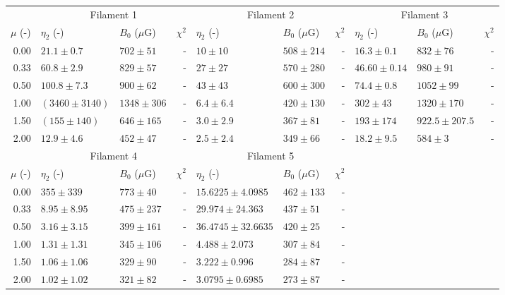 \begin{tabular}{@{}rllr llr llr@{}}

\toprule
{} & \multicolumn{3}{c}{Filament 1}
   & \multicolumn{3}{c}{Filament 2}
   & \multicolumn{3}{c}{Filament 3} \\
\cmidrule(lr){2-4} \cmidrule(lr){5-7} \cmidrule(lr){8-10}
$\mu$ (-) & $\eta_2$ (-) & $B_0$ ($\mu$G) & $\chi^2$
          & $\eta_2$ (-) & $B_0$ ($\mu$G) & $\chi^2$
          & $\eta_2$ (-) & $B_0$ ($\mu$G) & $\chi^2$ \\

\midrule
0.00 & $21.1 \pm 0.7$ & $702 \pm 51$ & -
     & $10 \pm 10$ & $508 \pm 214$ & -
     & $16.3 \pm 0.1$ & $832 \pm 76$ & - \\
0.33 & $60.8 \pm 2.9$ & $829 \pm 57$ & -
     & $27 \pm 27$ & $570\pm280$ & -
     & $46.60 \pm 0.14$ & $980 \pm 91$ & - \\
0.50 & $100.8 \pm 7.3$ & $900 \pm 62$ & -
     & $43 \pm 43$ & $600\pm300$ & -
     & $74.4 \pm 0.8$ & $1052 \pm 99$ & - \\
1.00 & $\left(3460 \pm 3140\right)$\tablenotemark{a} & $1348 \pm 306$ & -
     & $6.4 \pm 6.4$ & $420 \pm 130$ & -
     & $302 \pm 43$ & $1320 \pm 170$ & - \\
1.50 & $\left(155 \pm 140\right)$\tablenotemark{a} & $646 \pm 165$ & -
     & $3.0 \pm 2.9$ & $367 \pm 81$ & -
     & $193 \pm 174$ & $922.5 \pm 207.5$ & - \\
2.00 & $12.9 \pm 4.6$ & $452 \pm 47$ & -
     & $2.5 \pm 2.4$ & $349\pm66$ & -
     & $18.2 \pm 9.5$ & $584 \pm 3$ & - \\

\midrule
{} & \multicolumn{3}{c}{Filament 4}
   & \multicolumn{3}{c}{Filament 5} \\
\cmidrule(lr){2-4} \cmidrule(lr){5-7}
$\mu$ (-) & $\eta_2$ (-) & $B_0$ ($\mu$G) & $\chi^2$
          & $\eta_2$ (-) & $B_0$ ($\mu$G) & $\chi^2$ \\

\cmidrule(lr){1-7}
0.00 & $355 \pm 339$ & $773 \pm 40$ & -
     & $15.6225 \pm 4.0985$ & $462 \pm 133$ & - \\
0.33 & $8.95 \pm 8.95$ & $475 \pm 237$ & -
     & $29.974 \pm 24.363$ & $437 \pm 51$ & - \\
0.50 & $3.16 \pm 3.15$ & $399 \pm 161$ & -
     & $36.4745 \pm 32.6635$ & $420 \pm 25$ & - \\
1.00 & $1.31 \pm 1.31$ & $345 \pm 106$ & -
     & $4.488 \pm 2.073$ & $307 \pm 84$ & - \\
1.50 & $1.06 \pm 1.06$ & $329 \pm 90$ & -
     & $3.222 \pm 0.996$ & $284 \pm 87$ & - \\
2.00 & $1.02 \pm 1.02$ & $321 \pm 82$ & -
     & $3.0795 \pm 0.6985$ & $273 \pm 87$ & - \\

\bottomrule
\end{tabular}
